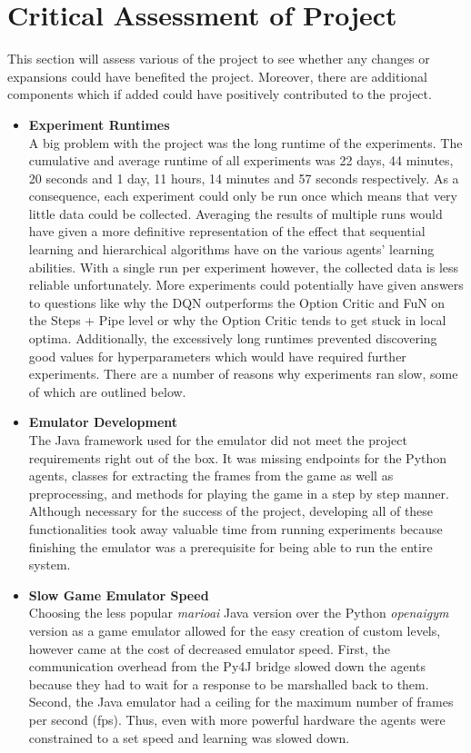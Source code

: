 \documentclass[notitlepage,a4paper,11pt]{article}
\begin{document}
\section{Critical Assessment of Project}
This section will assess various of the project to see whether any changes or expansions could have benefited the project. Moreover, there are additional components which if added could have positively contributed to the project. 

\begin{itemize}
	\item
	\textbf{Experiment Runtimes}\\
	A big problem with the project was the long runtime of the experiments. The cumulative and average runtime of all experiments was 22 days, 44 minutes, 20 seconds and 1 day, 11 hours, 14 minutes and 57 seconds respectively. As a consequence, each experiment could only be run once which means that very little data could be collected. Averaging the results of multiple runs would have given a more definitive representation of the effect that sequential learning and hierarchical algorithms have on the various agents' learning abilities. With a single run per experiment however, the collected data is less reliable unfortunately. More experiments could potentially have given answers to questions like why the DQN outperforms the Option Critic and FuN on the Steps + Pipe level or why the Option Critic tends to get stuck in local optima. Additionally, the excessively long runtimes prevented discovering good values for hyperparameters which would have required further experiments. There are a number of reasons why experiments ran slow, some of which are outlined below.
	
	
	
	\item
	\textbf{Emulator Development}\\
	The Java framework used for the emulator did not meet the project requirements right out of the box. It was missing endpoints for the Python agents, classes for extracting the frames from the game as well as preprocessing, and methods for playing the game in a step by step manner. Although necessary for the success of the project, developing all of these functionalities took away valuable time from running experiments because finishing the emulator was a prerequisite for being able to run the entire system.
	
	\item
	\textbf{Slow Game Emulator Speed}\\
	Choosing the less popular \textit{marioai} Java version over the Python \textit{openaigym} version as a game emulator allowed for the easy creation of custom levels, however came at the cost of decreased emulator speed. First, the communication overhead from the Py4J bridge slowed down the agents because they had to wait for a response to be marshalled back to them. Second, the Java emulator had a ceiling for the maximum number of frames per second (fps). Thus, even with more powerful hardware the agents were constrained to a set speed and learning was slowed down.
	

\end{itemize}
\end{document}
